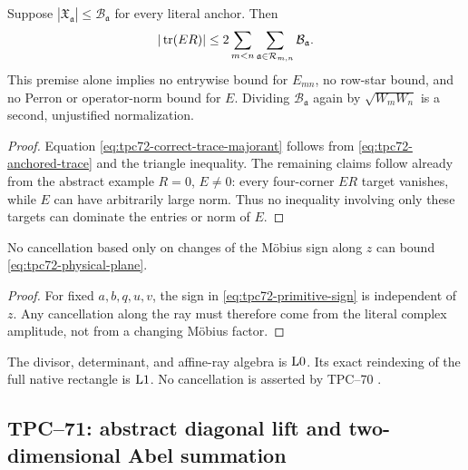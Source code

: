 \begin{proposition}
\label{prop:four-corners-not-entry}
Suppose
\(
 |\mathfrak X_{\mathfrak a}|
 \le \mathcal B_{\mathfrak a}
\)
for every literal anchor.  Then
\begin{equation}
 |\operatorname{tr}(ER)|
 \le
 2\sum_{m<n}
 \sum_{\mathfrak a\in\mathcal R_{m,n}}
 \mathcal B_{\mathfrak a}.
 \label{eq:tpc72-correct-trace-majorant}
\end{equation}
This premise alone implies no entrywise bound for \(E_{mn}\), no row-star
bound, and no Perron or operator-norm bound for \(E\).  Dividing
\(\mathcal B_{\mathfrak a}\) again by \(\sqrt{W_mW_n}\) is a second,
unjustified normalization.
\end{proposition}

\begin{proof}
Equation \eqref{eq:tpc72-correct-trace-majorant} follows from
\eqref{eq:tpc72-anchored-trace} and the triangle inequality.  The remaining
claims follow already from the abstract example \(R=0\), \(E\ne0\):
every four-corner \(ER\) target vanishes, while \(E\) can have arbitrarily
large norm.  Thus no inequality involving only these targets can dominate
the entries or norm of \(E\).
\end{proof}

\begin{proposition}
\label{prop:no-ray-sign-door}
No cancellation based only on changes of the M\"obius sign along \(z\) can
bound \eqref{eq:tpc72-physical-plane}.
\end{proposition}

\begin{proof}
For fixed \(a,b,q,u,v\), the sign in
\eqref{eq:tpc72-primitive-sign} is independent of \(z\).  Any cancellation
along the ray must therefore come from the literal complex amplitude, not
from a changing M\"obius factor.
\end{proof}

The divisor, determinant, and affine-ray algebra is \(\mathrm{L0}\).  Its exact
reindexing of the full native rectangle is \(\mathrm{L1}\).  No cancellation is
asserted by TPC--70 \citep{WangTPC70}.

\subsection{TPC--71: abstract diagonal lift and two-dimensional Abel summation}

